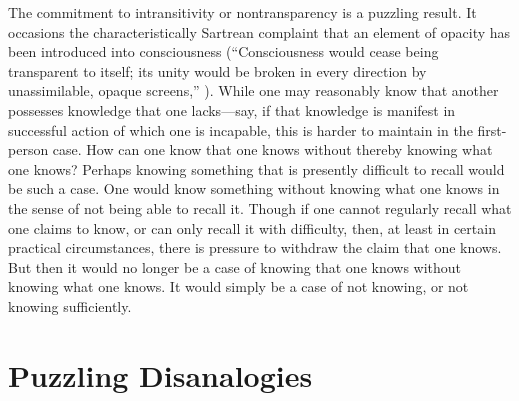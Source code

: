 The commitment to intransitivity or nontransparency is a puzzling result. It occasions the characteristically Sartrean complaint that an element of opacity has been introduced into consciousness (``Consciousness would cease being transparent to itself; its unity would be broken in every direction by unassimilable, opaque screens,'' \citealt[6]{Sartre:1948aa}). While one may reasonably know that another possesses knowledge that one lacks—say, if that knowledge is manifest in successful action of which one is incapable, this is harder to maintain in the first-person case. How can one know that one knows without thereby knowing what one knows? Perhaps knowing something that is presently difficult to recall would be such a case. One would know something without knowing what one knows in the sense of not being able to recall it. Though if one cannot regularly recall what one claims to know, or can only recall it with difficulty, then, at least in certain practical circumstances, there is pressure to withdraw the claim that one knows. But then it would no longer be a case of knowing that one knows without knowing what one knows. It would simply be a case of not knowing, or not knowing sufficiently.



\section{Puzzling Disanalogies} %
\label{sec:puzzling_disanalogies}


